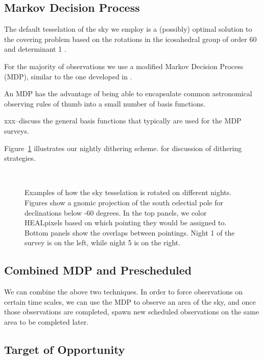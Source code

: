 \documentclass[]{aastex631}
\begin{document}
\subsection{Markov Decision Process}

The default tesselation of the sky we employ is a (possibly) optimal solution to the covering problem based on the rotations in the icosahedral group of order 60 and determinant 1 \citep{Hardin94}.  

For the majority of observations we use a modified Markov Decision Process (MDP), similar to the one developed in \citet{Naghib2019}.

An MDP has the advantage of being able to encapsulate common astronomical observing rules of thumb into a small number of basis functions. 

xxx--discuss the general basis functions that typically are used for the MDP surveys. 


Figure~\ref{fig:tesselation} illustrates our nightly dithering scheme. \citet{Awan2016} for discussion of dithering strategies. 

\begin{figure}
     \\
    \caption{Examples of how the sky tesselation is rotated on different nights. Figures show a gnomic projection of the south celectial pole for declinations below -60 degrees. In the top panels, we color HEALpixels based on which pointing they would be assigned to. Bottom panels show the overlaps between pointings. Night 1 of the survey is on the left, while night 5 is on the right. \label{fig:tesselation}}
\end{figure}

\subsection{Combined MDP and Prescheduled}

We can combine the above two techniques. In order to force observations on certain time scales, we can use the MDP to observe an area of the sky, and once those observations are completed, spawn new scheduled observations on the same area to be completed later. 

\subsection{Target of Opportunity}
\end{document}

